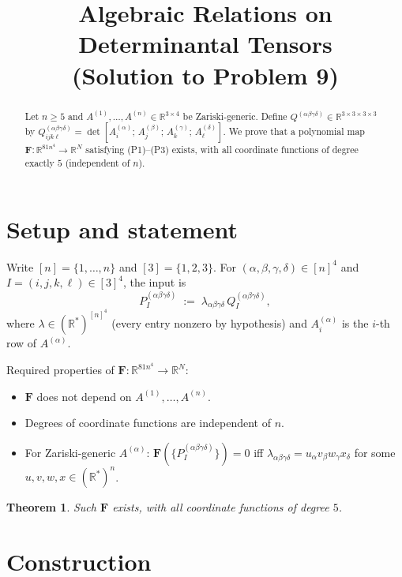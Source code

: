 \documentclass[12pt]{article}
\title{Algebraic Relations on Determinantal Tensors\\
  (Solution to Problem 9)}
\author{}
\date{}
\newtheorem{theorem}{Theorem}
\theoremstyle{definition}
\newcommand{\bR}{\mathbb{R}}
\begin{document}
\maketitle

\begin{abstract}
Let $n\geq 5$ and $A^{(1)},\ldots,A^{(n)}\in\bR^{3\times 4}$ be Zariski-generic.
Define $Q^{(\alpha\beta\gamma\delta)}\in\bR^{3\times 3\times 3\times 3}$ by
$Q^{(\alpha\beta\gamma\delta)}_{ijk\ell}=\det[A^{(\alpha)}_i;\,A^{(\beta)}_j;\,A^{(\gamma)}_k;\,A^{(\delta)}_\ell]$.
We prove that a polynomial map $\mathbf{F}:\bR^{81n^4}\to\bR^N$ satisfying (P1)--(P3) exists,
with all coordinate functions of degree exactly $5$ (independent of $n$).
\end{abstract}

\section{Setup and statement}

Write $[n]=\{1,\ldots,n\}$ and $[3]=\{1,2,3\}$. For $(\alpha,\beta,\gamma,\delta)\in[n]^4$ and
$I=(i,j,k,\ell)\in[3]^4$, the input is
\[
  P^{(\alpha\beta\gamma\delta)}_I
  \;:=\;
  \lambda_{\alpha\beta\gamma\delta}\,Q^{(\alpha\beta\gamma\delta)}_I,
\]
where $\lambda\in(\bR^*)^{[n]^4}$ (every entry nonzero by hypothesis) and $A^{(\alpha)}_i$
is the $i$-th row of $A^{(\alpha)}$.

Required properties of $\mathbf{F}:\bR^{81n^4}\to\bR^N$:
\begin{itemize}
\item[(P1)] $\mathbf{F}$ does not depend on $A^{(1)},\ldots,A^{(n)}$.
\item[(P2)] Degrees of coordinate functions are independent of $n$.
\item[(P3)] For Zariski-generic $A^{(\alpha)}$:
  $\mathbf{F}(\{P^{(\alpha\beta\gamma\delta)}_I\})=0$
  iff $\lambda_{\alpha\beta\gamma\delta}=u_\alpha v_\beta w_\gamma x_\delta$
  for some $u,v,w,x\in(\bR^*)^n$.
\end{itemize}

\begin{theorem}\label{thm:main}
Such $\mathbf{F}$ exists, with all coordinate functions of degree $5$.
\end{theorem}

\section{Construction}\label{sec:construction}
\end{document}
